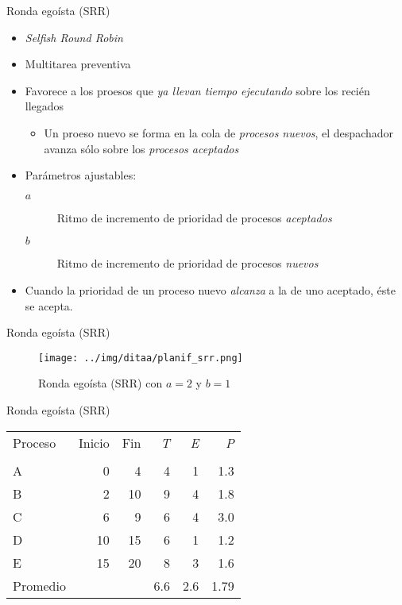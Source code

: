 \documentclass[presentation]{beamer}
\begin{document}
\begin{frame}[label={sec:org5b95f88}]{Ronda egoísta (SRR)}
\begin{itemize}
\item \emph{Selfish Round Robin}
\item Multitarea preventiva
\item Favorece a los proesos que \emph{ya llevan tiempo ejecutando} sobre los
recién llegados
\begin{itemize}
\item Un proeso nuevo se forma en la cola de \emph{procesos nuevos}, el
despachador avanza sólo sobre los \emph{procesos aceptados}
\end{itemize}
\item Parámetros ajustables:
\begin{description}
\item[{\(a\)}] Ritmo de incremento de prioridad de procesos \emph{aceptados}
\item[{\(b\)}] Ritmo de incremento de prioridad de procesos \emph{nuevos}
\end{description}
\item Cuando la prioridad de un proceso nuevo \emph{alcanza} a la de uno
aceptado, éste se acepta.
\end{itemize}
\end{frame}

\begin{frame}[label={sec:org5a77aeb}]{Ronda egoísta (SRR)}
\begin{figure}[htbp]
\centering
\texttt{[image: ../img/ditaa/planif\_srr.png]}
\caption{Ronda egoísta (SRR) con \(a = 2\) y \(b = 1\)}
\end{figure}
\end{frame}

\begin{frame}[label={sec:org2c7c595}]{Ronda egoísta (SRR)}
\begin{center}
\begin{tabular}{lrrrrr}
Proceso & Inicio & Fin & \emph{T} & \emph{E} & \emph{P}\\
 &  &  &  &  & \\
\hline
A & 0 & 4 & 4 & 1 & 1.3\\
B & 2 & 10 & 9 & 4 & 1.8\\
C & 6 & 9 & 6 & 4 & 3.0\\
D & 10 & 15 & 6 & 1 & 1.2\\
E & 15 & 20 & 8 & 3 & 1.6\\
\hline
Promedio &  &  & 6.6 & 2.6 & 1.79\\
\end{tabular}
\end{center}
\end{frame}
\end{document}
